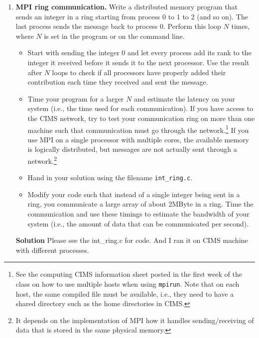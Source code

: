\documentclass[12pt]{article}
\begin{document}
\begin{enumerate}

\item {\bf MPI ring communication.}  Write a distributed memory
  program that sends an integer in a ring starting from process 0 to 1
  to 2 (and so on). The last process sends the message back to process
  0. Perform this loop $N$ times, where $N$ is set in the program or
  on the command line.
  \begin{itemize}
  \item Start with sending the integer 0 and let every process add its
    rank to the integer it received before it sends it to the next
    processor. Use the result
    after $N$ loops to check if all processors have properly added
    their contribution each time they received and sent the message.
  \item Time your program for a larger $N$ and estimate the latency on
    your system (i.e., the time used for each communication).  If you
    have access to the CIMS network, try to test your communication
    ring on more than one machine such that communication must go
    through the network.\footnote{See the computing \@ CIMS
      information sheet posted in the first week of the class
      on how to use multiple hosts when using \texttt{mpirun}. Note
      that on each host, the same compiled file must be available,
      i.e., they need to have a shared directory such as the home
      directories in CIMS.} If you
    use MPI on a single processor with multiple cores, the available
    memory is logically distributed, but messages are not actually
    sent through a network.\footnote{It depends on the implementation
      of MPI how it handles sending/receiving of data that is stored
      in the same physical memory.}
  \item Hand in your solution using the filename \texttt{int\_ring.c}.
  \item Modify your code such that instead of a single integer being
    sent in a ring, you communicate a large array of about 2MByte in a
    ring. Time the communication and use these timings to estimate the
    bandwidth of your system (i.e., the amount of data that can be
    communicated per second).
  \end{itemize}
  
	\textbf{Solution}
	Please see the int\_ring.c for code. And I ran it on CIMS machine with different processes. 
	

\end{enumerate}
\end{document}
